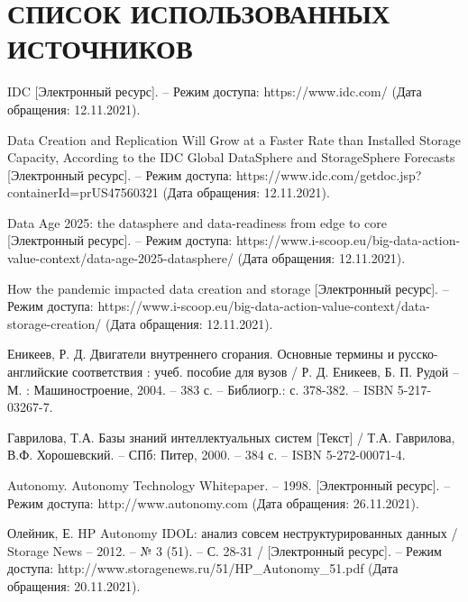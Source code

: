 \section*{СПИСОК ИСПОЛЬЗОВАННЫХ ИСТОЧНИКОВ}

\begingroup
\renewcommand{\section}[2]{}
\begin{thebibliography}{}
	 IDC [Электронный ресурс]. -- Режим доступа: https://www.idc.com/ (Дата обращения: 12.11.2021).
	
	 Data Creation and Replication Will Grow at a Faster Rate than Installed Storage Capacity, According to the IDC Global DataSphere and StorageSphere Forecasts [Электронный ресурс]. -- Режим доступа: https://www.idc.com/getdoc.jsp?containerId=prUS47560321 (Дата обращения: 12.11.2021).
	
	 Data Age 2025: the datasphere and data-readiness from edge to core [Электронный ресурс]. -- Режим доступа: https://www.i-scoop.eu/big-data-action-value-context/data-age-2025-datasphere/ (Дата обращения: 12.11.2021).
	
	 How the pandemic impacted data creation and storage [Электронный ресурс]. -- Режим доступа: https://www.i-scoop.eu/big-data-action-value-context/data-storage-creation/ (Дата обращения: 12.11.2021).
	
	 Еникеев, Р. Д. Двигатели внутреннего сгорания. Основные термины и русско-английские соответствия : учеб. пособие для вузов / Р. Д. Еникеев, Б. П. Рудой -- М. : Машиностроение, 2004. -- 383 с. -- Библиогр.: с. 378-382. -- ISBN 5-217-03267-7.
	
	 Гаврилова, Т.А. Базы знаний интеллектуальных систем [Текст] / Т.А. Гаврилова, В.Ф. Хорошевский. -- СПб: Питер, 2000. -- 384 с. -- ISBN 5-272-00071-4.
	
	 Autonomy. Autonomy Technology Whitepaper. -- 1998. [Электронный ресурс]. -- Режим доступа: http://www.autonomy.com (Дата обращения: 26.11.2021).
	
	 Олейник, Е. HP Autonomy IDOL: анализ совсем неструктурированных данных / Storage News --  2012. -- № 3 (51). -- С. 28-31 / [Электронный ресурс]. -- Режим доступа: http://www.storagenews.ru/51/HP\_Autonomy\_51.pdf (Дата обращения: 20.11.2021).
	

\end{thebibliography}
